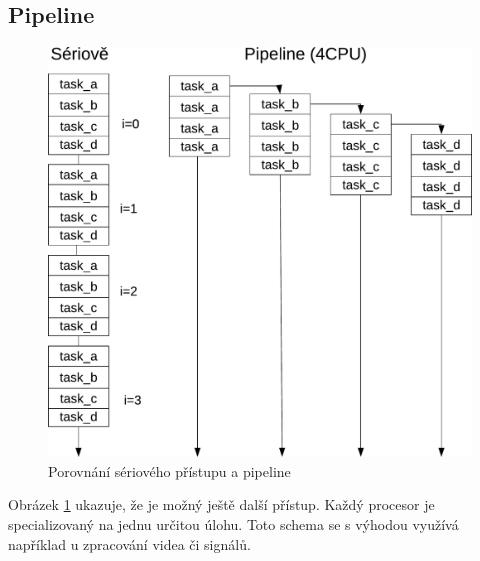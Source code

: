 \subsection{Pipeline}

\begin{figure}
  \begin{center}
    \includegraphics[scale=.6]{obr/pipeline}
  \end{center}
  \caption{Porovnání sériového přístupu a pipeline}
  \label{obr:serialvspipeline}
\end{figure}

Obrázek \ref{obr:serialvspipeline} ukazuje, že je možný ještě další přístup. Každý procesor je specializovaný na jednu určitou úlohu. Toto schema se s výhodou využívá
například u zpracování videa či signálů. 